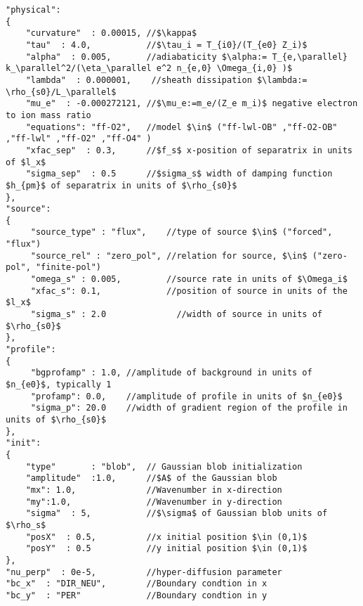 \begin{verbatim}
"physical":
{
    "curvature"  : 0.00015, //$\kappa$
    "tau"  : 4.0,           //$\tau_i = T_{i0}/(T_{e0} Z_i)$
    "alpha"  : 0.005,       //adiabaticity $\alpha:= T_{e,\parallel} k_\parallel^2/(\eta_\parallel e^2 n_{e,0} \Omega_{i,0} )$
    "lambda"  : 0.000001,    //sheath dissipation $\lambda:= \rho_{s0}/L_\parallel$
    "mu_e"  : -0.000272121, //$\mu_e:=m_e/(Z_e m_i)$ negative electron to ion mass ratio
    "equations": "ff-O2",   //model $\in$ ("ff-lwl-OB" ,"ff-O2-OB" ,"ff-lwl" ,"ff-O2" ,"ff-O4" )
    "xfac_sep"  : 0.3,      //$f_s$ x-position of separatrix in units of $l_x$     
    "sigma_sep"  : 0.5      //$sigma_s$ width of damping function $h_{pm}$ of separatrix in units of $\rho_{s0}$    
},
"source":
{
     "source_type" : "flux",    //type of source $\in$ ("forced", "flux")
     "source_rel" : "zero_pol", //relation for source, $\in$ ("zero-pol", "finite-pol")
     "omega_s" : 0.005,         //source rate in units of $\Omega_i$
     "xfac_s": 0.1,             //position of source in units of the $l_x$
     "sigma_s" : 2.0              //width of source in units of $\rho_{s0}$
},
"profile":
{
     "bgprofamp" : 1.0, //amplitude of background in units of $n_{e0}$, typically 1
     "profamp": 0.0,    //amplitude of profile in units of $n_{e0}$
     "sigma_p": 20.0    //width of gradient region of the profile in units of $\rho_{s0}$
},
"init":
{
    "type"       : "blob",  // Gaussian blob initialization
    "amplitude"  :1.0,      //$A$ of the Gaussian blob
    "mx": 1.0,              //Wavenumber in x-direction
    "my":1.0,               //Wavenumber in y-direction
    "sigma"  : 5,           //$\sigma$ of Gaussian blob units of $\rho_s$
    "posX"  : 0.5,          //x initial position $\in (0,1)$
    "posY"  : 0.5           //y initial position $\in (0,1)$
},
"nu_perp"  : 0e-5,          //hyper-diffusion parameter
"bc_x"  : "DIR_NEU",        //Boundary condtion in x
"bc_y"  : "PER"             //Boundary condtion in y
\end{verbatim}
